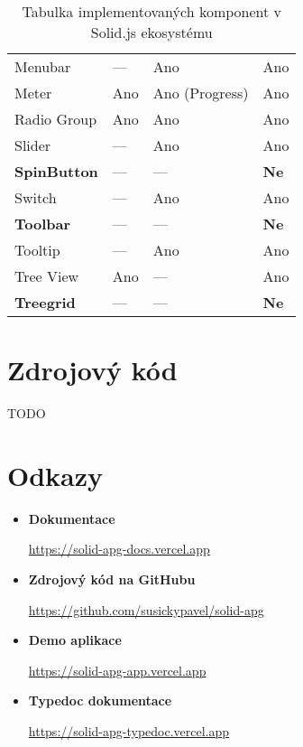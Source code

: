 \documentclass{ctuthesis}
\begin{document}
\begin{table}[ht]
\begin{tabularx}{\textwidth}{Y Y Y Y}
        Menubar               & ---                   & Ano                & Ano                               \\
        Meter                 & Ano                   & Ano (Progress)     & Ano                               \\
        Radio Group           & Ano                   & Ano                & Ano                               \\
        Slider                & ---                   & Ano                & Ano                               \\
        \textbf{SpinButton}   & ---                   & ---                & \textbf{Ne}                       \\
        Switch                & ---                   & Ano                & Ano                               \\
        \textbf{Toolbar}      & ---                   & ---                & \textbf{Ne}                       \\
        Tooltip               & ---                   & Ano                & Ano                               \\
        Tree View             & Ano                   & ---                & Ano                               \\
        \textbf{Treegrid}     & ---                   & ---                & \textbf{Ne}                       \\
    \end{tabularx}
    \caption{Tabulka implementovaných komponent v Solid.js ekosystému}
    \label{tab:implemented-components}
\end{table}

\chapter{Zdrojový kód}

TODO

\chapter{Odkazy}

\begin{itemize}
    \item \textbf{Dokumentace}

          \url{https://solid-apg-docs.vercel.app}
    \item \textbf{Zdrojový kód na GitHubu}

          \url{https://github.com/susickypavel/solid-apg}
    \item \textbf{Demo aplikace}

          \url{https://solid-apg-app.vercel.app}

    \item \textbf{Typedoc dokumentace}

          \url{https://solid-apg-typedoc.vercel.app}
\end{itemize}
\end{document}
